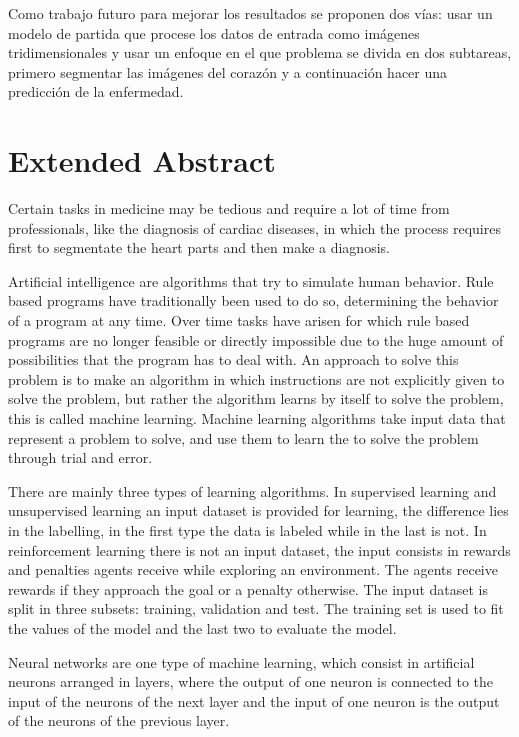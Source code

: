 \documentclass[12pt,a4paper]{article}
\begin{document}
Como trabajo futuro para mejorar los resultados se proponen dos vías: usar un modelo de partida que procese los datos de entrada como imágenes tridimensionales y usar un enfoque en el que problema se divida en dos subtareas, primero segmentar las imágenes del corazón y a continuación hacer una predicción de la enfermedad.

\newpage
\section*{Extended Abstract}
Certain tasks in medicine may be tedious and require a lot of time from professionals, like the diagnosis of cardiac diseases, in which the process requires first to segmentate the heart parts and then make a diagnosis.
\bigskip

Artificial intelligence are algorithms that try to simulate human behavior. Rule based programs have traditionally been used to do so, determining the behavior of a program at any time. Over time tasks have arisen for which rule based programs are no longer feasible or directly impossible due to the huge amount of possibilities that the program has to deal with. An approach to solve this problem is to make an algorithm in which instructions are not explicitly given to solve the problem, but rather the algorithm learns by itself to solve the problem, this is called machine learning. Machine learning algorithms take input data that represent a problem to solve, and use them to learn the to solve the problem through trial and error.
\bigskip

There are mainly three types of learning algorithms. In supervised learning and unsupervised learning an input dataset is provided for learning, the difference lies in the labelling, in the first type the data is labeled while in the last is not. In reinforcement learning there is not an input dataset, the input consists in rewards and penalties agents receive while exploring an environment. The agents receive rewards if they approach the goal or a penalty otherwise. The input dataset is split in three subsets: training, validation and test. The training set is used to fit the values of the model and the last two to evaluate the model.
\bigskip

Neural networks are one type of machine learning, which consist in artificial neurons arranged in layers, where the output of one neuron is connected to the input of the neurons of the next layer and the input of one neuron is the output of the neurons of the previous layer.
\bigskip
\end{document}
